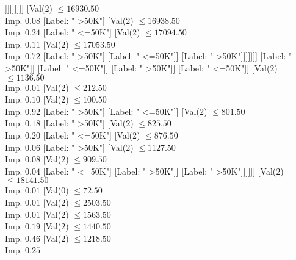\documentclass[margin=10pt]{standalone}
\begin{document}
\begin{forest}
																		[Label: " <=50K"]
																		[Val($2$) $ \leq 16036.50$ \\ Imp. $0.32$
																			[Label: " >50K"]
																			[Val($2$) $ \leq 16258.50$ \\ Imp. $0.31$
																				[Label: " <=50K"]
																				[Val($2$) $ \leq 16316.50$ \\ Imp. $1.00$
																					[Label: " >50K"]
																					[Label: " <=50K"]]]]]]]]]
													[Val($2$) $ \leq 16930.50$ \\ Imp. $0.08$
														[Label: " >50K"]
														[Val($2$) $ \leq 16938.50$ \\ Imp. $0.24$
															[Label: " <=50K"]
															[Val($2$) $ \leq 17094.50$ \\ Imp. $0.11$
																[Val($2$) $ \leq 17053.50$ \\ Imp. $0.72$
																	[Label: " >50K"]
																	[Label: " <=50K"]]
																[Label: " >50K"]]]]]]]
										[Label: " >50K"]]
									[Label: " <=50K"]]
								[Label: " >50K"]]
							[Label: " <=50K"]]
						[Val($2$) $ \leq 1136.50$ \\ Imp. $0.01$
							[Val($2$) $ \leq 212.50$ \\ Imp. $0.10$
								[Val($2$) $ \leq 100.50$ \\ Imp. $0.92$
									[Label: " >50K"]
									[Label: " <=50K"]]
								[Val($2$) $ \leq 801.50$ \\ Imp. $0.18$
									[Label: " >50K"]
									[Val($2$) $ \leq 825.50$ \\ Imp. $0.20$
										[Label: " <=50K"]
										[Val($2$) $ \leq 876.50$ \\ Imp. $0.06$
											[Label: " >50K"]
											[Val($2$) $ \leq 1127.50$ \\ Imp. $0.08$
												[Val($2$) $ \leq 909.50$ \\ Imp. $0.04$
													[Label: " <=50K"]
													[Label: " >50K"]]
												[Label: " >50K"]]]]]]
							[Val($2$) $ \leq 18141.50$ \\ Imp. $0.01$
								[Val($0$) $ \leq 72.50$ \\ Imp. $0.01$
									[Val($2$) $ \leq 2503.50$ \\ Imp. $0.01$
										[Val($2$) $ \leq 1563.50$ \\ Imp. $0.19$
											[Val($2$) $ \leq 1440.50$ \\ Imp. $0.46$
												[Val($2$) $ \leq 1218.50$ \\ Imp. $0.25$

\end{forest}
\end{document}
